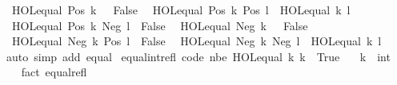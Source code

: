 \begin{isabellebody}
\ \ {\isachardoublequoteopen}HOL{\isachardot}{\kern0pt}equal\ {\isacharparenleft}{\kern0pt}Pos\ k{\isacharparenright}{\kern0pt}\ {}\ {\isasymlongleftrightarrow}\ False{\isachardoublequoteclose}\isanewline
\ \ {\isachardoublequoteopen}HOL{\isachardot}{\kern0pt}equal\ {\isacharparenleft}{\kern0pt}Pos\ k{\isacharparenright}{\kern0pt}\ {\isacharparenleft}{\kern0pt}Pos\ l{\isacharparenright}{\kern0pt}\ {\isasymlongleftrightarrow}\ HOL{\isachardot}{\kern0pt}equal\ k\ l{\isachardoublequoteclose}\isanewline
\ \ {\isachardoublequoteopen}HOL{\isachardot}{\kern0pt}equal\ {\isacharparenleft}{\kern0pt}Pos\ k{\isacharparenright}{\kern0pt}\ {\isacharparenleft}{\kern0pt}Neg\ l{\isacharparenright}{\kern0pt}\ {\isasymlongleftrightarrow}\ False{\isachardoublequoteclose}\isanewline
\ \ {\isachardoublequoteopen}HOL{\isachardot}{\kern0pt}equal\ {\isacharparenleft}{\kern0pt}Neg\ k{\isacharparenright}{\kern0pt}\ {}\ {\isasymlongleftrightarrow}\ False{\isachardoublequoteclose}\isanewline
\ \ {\isachardoublequoteopen}HOL{\isachardot}{\kern0pt}equal\ {\isacharparenleft}{\kern0pt}Neg\ k{\isacharparenright}{\kern0pt}\ {\isacharparenleft}{\kern0pt}Pos\ l{\isacharparenright}{\kern0pt}\ {\isasymlongleftrightarrow}\ False{\isachardoublequoteclose}\isanewline
\ \ {\isachardoublequoteopen}HOL{\isachardot}{\kern0pt}equal\ {\isacharparenleft}{\kern0pt}Neg\ k{\isacharparenright}{\kern0pt}\ {\isacharparenleft}{\kern0pt}Neg\ l{\isacharparenright}{\kern0pt}\ {\isasymlongleftrightarrow}\ HOL{\isachardot}{\kern0pt}equal\ k\ l{\isachardoublequoteclose}\isanewline
%
\isadelimproof
\ \ %
\endisadelimproof
%
\isatagproof
{}\isamarkupfalse%
\ {\isacharparenleft}{\kern0pt}auto\ simp\ add{\isacharcolon}{\kern0pt}\ equal{\isacharparenright}{\kern0pt}%
\endisatagproof
{\isafoldproof}%
%
\isadelimproof
\isanewline
%
\endisadelimproof
\isanewline
{}\isamarkupfalse%
\ equal{\isacharunderscore}{\kern0pt}int{\isacharunderscore}{\kern0pt}refl\ {\isacharbrackleft}{\kern0pt}code\ nbe{\isacharbrackright}{\kern0pt}{\isacharcolon}{\kern0pt}\ {\isachardoublequoteopen}HOL{\isachardot}{\kern0pt}equal\ k\ k\ {\isasymlongleftrightarrow}\ True{\isachardoublequoteclose}\isanewline
\ \ \ k\ {\isacharcolon}{\kern0pt}{\isacharcolon}{\kern0pt}\ int\isanewline
%
\isadelimproof
\ \ %
\endisadelimproof
%
\isatagproof
{}\isamarkupfalse%
\ {\isacharparenleft}{\kern0pt}fact\ equal{\isacharunderscore}{\kern0pt}refl{\isacharparenright}{\kern0pt}%
\endisatagproof
{\isafoldproof}%
%
\isadelimproof
\isanewline
%
\endisadelimproof
\isanewline
{}\isamarkupfalse%

\end{isabellebody}

